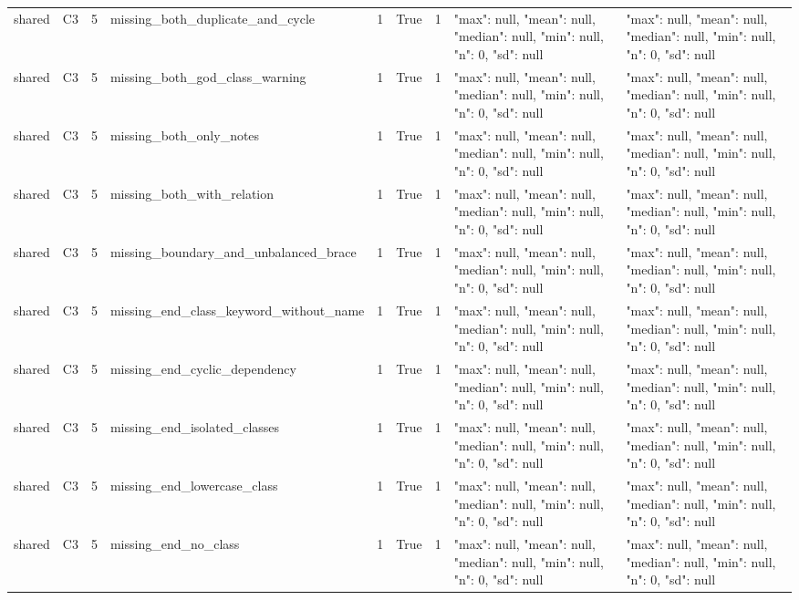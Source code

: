 \begin{tabular}{lllllllll}
shared & C3 & 5 & missing\_both\_duplicate\_and\_cycle & 1 & True & 1 & {"max": null, "mean": null, "median": null, "min": null, "n": 0, "sd": null} & {"max": null, "mean": null, "median": null, "min": null, "n": 0, "sd": null} \\
shared & C3 & 5 & missing\_both\_god\_class\_warning & 1 & True & 1 & {"max": null, "mean": null, "median": null, "min": null, "n": 0, "sd": null} & {"max": null, "mean": null, "median": null, "min": null, "n": 0, "sd": null} \\
shared & C3 & 5 & missing\_both\_only\_notes & 1 & True & 1 & {"max": null, "mean": null, "median": null, "min": null, "n": 0, "sd": null} & {"max": null, "mean": null, "median": null, "min": null, "n": 0, "sd": null} \\
shared & C3 & 5 & missing\_both\_with\_relation & 1 & True & 1 & {"max": null, "mean": null, "median": null, "min": null, "n": 0, "sd": null} & {"max": null, "mean": null, "median": null, "min": null, "n": 0, "sd": null} \\
shared & C3 & 5 & missing\_boundary\_and\_unbalanced\_brace & 1 & True & 1 & {"max": null, "mean": null, "median": null, "min": null, "n": 0, "sd": null} & {"max": null, "mean": null, "median": null, "min": null, "n": 0, "sd": null} \\
shared & C3 & 5 & missing\_end\_class\_keyword\_without\_name & 1 & True & 1 & {"max": null, "mean": null, "median": null, "min": null, "n": 0, "sd": null} & {"max": null, "mean": null, "median": null, "min": null, "n": 0, "sd": null} \\
shared & C3 & 5 & missing\_end\_cyclic\_dependency & 1 & True & 1 & {"max": null, "mean": null, "median": null, "min": null, "n": 0, "sd": null} & {"max": null, "mean": null, "median": null, "min": null, "n": 0, "sd": null} \\
shared & C3 & 5 & missing\_end\_isolated\_classes & 1 & True & 1 & {"max": null, "mean": null, "median": null, "min": null, "n": 0, "sd": null} & {"max": null, "mean": null, "median": null, "min": null, "n": 0, "sd": null} \\
shared & C3 & 5 & missing\_end\_lowercase\_class & 1 & True & 1 & {"max": null, "mean": null, "median": null, "min": null, "n": 0, "sd": null} & {"max": null, "mean": null, "median": null, "min": null, "n": 0, "sd": null} \\
shared & C3 & 5 & missing\_end\_no\_class & 1 & True & 1 & {"max": null, "mean": null, "median": null, "min": null, "n": 0, "sd": null} & {"max": null, "mean": null, "median": null, "min": null, "n": 0, "sd": null} \\

\end{tabular}
